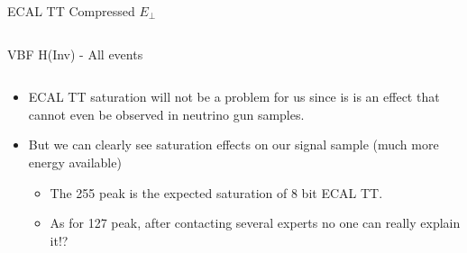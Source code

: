 \documentclass[8pt]{beamer}
\begin{document}
\begin{frame}{ECAL TT Compressed $E_{\perp}$}
\begin{columns}
\begin{block}{VBF H(Inv) - All events}
\end{block}

\end{columns}

\begin{tiny}

\begin{itemize}
  \item ECAL TT saturation will not be a problem for us since is is an effect that cannot even be observed in neutrino gun samples.
  \item But we can clearly see saturation effects on our signal sample (much more energy available)
  \begin{itemize}
    \tiny
    \item The 255 peak is the expected saturation of 8 bit ECAL TT.
    \item As for 127 peak, after contacting several experts no one can really explain it!? 
  \end{itemize}
\end{itemize}

\end{tiny}

\end{frame}
\end{document}
